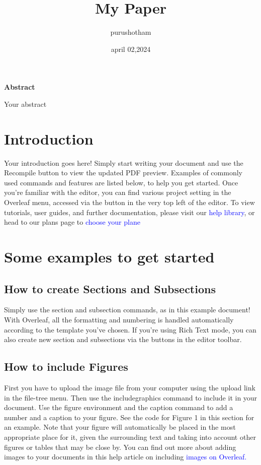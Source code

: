 \documentclass{article}
\title{My Paper}
\author{purushotham}
\date{april 02,2024}
\begin{document}
	\maketitle
	\begin{center}
		\textbf{Abstract}
	\end{center}
	Your abstract
	\section{Introduction}
	Your introduction goes here! Simply start writing your document and use the Recompile button to
	view the updated PDF preview. Examples of commonly used commands and features are listed below,
	to help you get started.
	Once you’re familiar with the editor, you can find various project setting in the Overleaf menu,
	accessed via the button in the very top left of the editor. To view tutorials, user guides, and further
	documentation, please visit our \textcolor{blue}{help library}, or head to our plans page to \textcolor{blue}{choose your plane}
	\section{Some examples to get started}
	\subsection{How to create Sections and Subsections}
	Simply use the section and subsection commands, as in this example document! With Overleaf, all
	the formatting and numbering is handled automatically according to the template you’ve chosen. If
	you’re using Rich Text mode, you can also create new section and subsections via the buttons in the
	editor toolbar.
	\subsection{How to include Figures}
	First you have to upload the image file from your computer using the upload link in the file-tree menu.
	Then use the includegraphics command to include it in your document. Use the figure environment
	and the caption command to add a number and a caption to your figure. See the code for Figure 1 in
	this section for an example.
	Note that your figure will automatically be placed in the most appropriate place for it, given the
	surrounding text and taking into account other figures or tables that may be close by. You can find
	out more about adding images to your documents in this help article on including \textcolor{blue}{images on Overleaf.}
	
\end{document}
